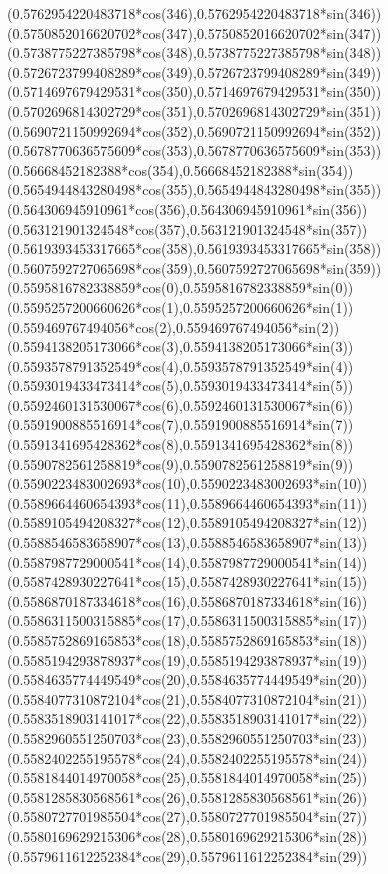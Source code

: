 {({0.5762954220483718*cos(346)},{0.5762954220483718*sin(346)})
({0.5750852016620702*cos(347)},{0.5750852016620702*sin(347)})
({0.5738775227385798*cos(348)},{0.5738775227385798*sin(348)})
({0.5726723799408289*cos(349)},{0.5726723799408289*sin(349)})
({0.5714697679429531*cos(350)},{0.5714697679429531*sin(350)})
({0.5702696814302729*cos(351)},{0.5702696814302729*sin(351)})
({0.5690721150992694*cos(352)},{0.5690721150992694*sin(352)})
({0.5678770636575609*cos(353)},{0.5678770636575609*sin(353)})
({0.56668452182388*cos(354)},{0.56668452182388*sin(354)})
({0.5654944843280498*cos(355)},{0.5654944843280498*sin(355)})
({0.564306945910961*cos(356)},{0.564306945910961*sin(356)})
({0.563121901324548*cos(357)},{0.563121901324548*sin(357)})
({0.5619393453317665*cos(358)},{0.5619393453317665*sin(358)})
({0.5607592727065698*cos(359)},{0.5607592727065698*sin(359)})
({0.5595816782338859*cos(0)},{0.5595816782338859*sin(0)})
({0.5595257200660626*cos(1)},{0.5595257200660626*sin(1)})
({0.559469767494056*cos(2)},{0.559469767494056*sin(2)})
({0.5594138205173066*cos(3)},{0.5594138205173066*sin(3)})
({0.5593578791352549*cos(4)},{0.5593578791352549*sin(4)})
({0.5593019433473414*cos(5)},{0.5593019433473414*sin(5)})
({0.5592460131530067*cos(6)},{0.5592460131530067*sin(6)})
({0.5591900885516914*cos(7)},{0.5591900885516914*sin(7)})
({0.5591341695428362*cos(8)},{0.5591341695428362*sin(8)})
({0.5590782561258819*cos(9)},{0.5590782561258819*sin(9)})
({0.5590223483002693*cos(10)},{0.5590223483002693*sin(10)})
({0.5589664460654393*cos(11)},{0.5589664460654393*sin(11)})
({0.5589105494208327*cos(12)},{0.5589105494208327*sin(12)})
({0.5588546583658907*cos(13)},{0.5588546583658907*sin(13)})
({0.5587987729000541*cos(14)},{0.5587987729000541*sin(14)})
({0.5587428930227641*cos(15)},{0.5587428930227641*sin(15)})
({0.5586870187334618*cos(16)},{0.5586870187334618*sin(16)})
({0.5586311500315885*cos(17)},{0.5586311500315885*sin(17)})
({0.5585752869165853*cos(18)},{0.5585752869165853*sin(18)})
({0.5585194293878937*cos(19)},{0.5585194293878937*sin(19)})
({0.5584635774449549*cos(20)},{0.5584635774449549*sin(20)})
({0.5584077310872104*cos(21)},{0.5584077310872104*sin(21)})
({0.5583518903141017*cos(22)},{0.5583518903141017*sin(22)})
({0.5582960551250703*cos(23)},{0.5582960551250703*sin(23)})
({0.5582402255195578*cos(24)},{0.5582402255195578*sin(24)})
({0.5581844014970058*cos(25)},{0.5581844014970058*sin(25)})
({0.5581285830568561*cos(26)},{0.5581285830568561*sin(26)})
({0.5580727701985504*cos(27)},{0.5580727701985504*sin(27)})
({0.5580169629215306*cos(28)},{0.5580169629215306*sin(28)})
({0.5579611612252384*cos(29)},{0.5579611612252384*sin(29)})
}
